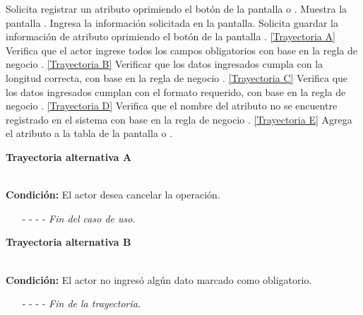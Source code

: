 	\begin{UCtrayectoria}
		\UCpaso[\UCactor] Solicita registrar un atributo oprimiendo el botón  de la pantalla  o .
		\UCpaso[\UCsist] Muestra la pantalla .
		\UCpaso[\UCactor] Ingresa la información solicitada en la pantalla. \label{CU7.1.1-P3}
		\UCpaso[\UCactor] Solicita guardar la información de atributo oprimiendo el botón  de la pantalla . \hyperlink{CU7-1-1:TAA}{[Trayectoria A]}
		\UCpaso[\UCsist] Verifica que el actor ingrese todos los campos obligatorios con base en la regla de negocio . \hyperlink{CU7-1-1:TAB}{[Trayectoria B]}
		\UCpaso[\UCsist] Verificar que los datos ingresados cumpla con la longitud correcta, con base en la regla de negocio . \hyperlink{CU7-1-1:TAC}{[Trayectoria C]}
		\UCpaso[\UCsist] Verifica que los datos ingresados cumplan con el formato requerido, con base en la regla de negocio . \hyperlink{CU7-1-1:TAD}{[Trayectoria D]}
		\UCpaso[\UCsist] Verifica que el nombre del atributo no se encuentre registrado en el sistema con base en la regla de negocio . \hyperlink{CU7-1-1:TAE}{[Trayectoria E]}
		\UCpaso[\UCsist] Agrega el atributo a la tabla de la pantalla  o .
	\end{UCtrayectoria}		
\hypertarget{CU7-1-1:TAA}{\textbf{Trayectoria alternativa A}}\\
\noindent \textbf{Condición:} El actor desea cancelar la operación.
\begin{enumerate}
	\UCpaso[\UCactor] Solicita cancelar la operación oprimiendo el botón  de la pantalla 
	\UCpaso[\UCsist] Muestra la pantalla .
	\item[- -] - - {\em {Fin del caso de uso}}.%
\end{enumerate}
\hypertarget{CU7-1-1:TAB}{\textbf{Trayectoria alternativa B}}\\
\noindent \textbf{Condición:} El actor no ingresó algún dato marcado como obligatorio.
\begin{enumerate}
	\UCpaso[\UCsist] Muestra el mensaje  señalando el campo que presenta el error en la pantalla .
	\UCpaso Regresa al paso \ref{CU7.1.1-P3} de la trayectoria principal.
	\item[- -] - - {\em {Fin de la trayectoria}}.%
\end{enumerate}
